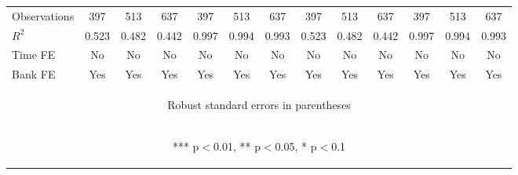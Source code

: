 \documentclass[]{article}
\begin{document}
\begin{center}
\begin{tabular}{lcccccccccccc}
Observations & 397 & 513 & 637 & 397 & 513 & 637 & 397 & 513 & 637 & 397 & 513 & 637 \\
$R^2$ & 0.523 & 0.482 & 0.442 & 0.997 & 0.994 & 0.993 & 0.523 & 0.482 & 0.442 & 0.997 & 0.994 & 0.993 \\
Time FE & No & No & No & No & No & No & No & No & No & No & No & No \\
 Bank FE & Yes & Yes & Yes & Yes & Yes & Yes & Yes & Yes & Yes & Yes & Yes & Yes \\ \hline
\multicolumn{13}{c}{\begin{footnotesize} Robust standard errors in parentheses\end{footnotesize}} \\
\multicolumn{13}{c}{\begin{footnotesize} *** p$<$0.01, ** p$<$0.05, * p$<$0.1\end{footnotesize}} \\
\end{tabular}
\end{center}
\end{document}
